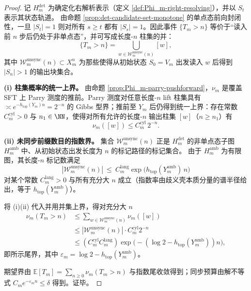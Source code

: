 \begin{proof}
记 \(H_m^{\mathrm{det}}\) 为确定化右解析表示（定义 \ref{def:Phi_m-right-resolving}），并以 \(S_t\) 表示其状态轨道。
由命题 \ref{prop:det-candidate-set-monotone} 的单点态前向封闭性，一旦 \(|S_t|=1\) 则对所有 \(s\ge t\) 都有 \(|S_s|=1\)。因此事件 \(\{T_m>n\}\) 等价于“读入前 \(n\) 步后仍处于非单点态”，并可写成长度-\(n\) 柱集的并：
\[
\{T_m>n\}=\bigcup_{w\in\mathcal{W}_{m}^{\mathrm{unsync}}(n)}[w],
\]
其中 \(\mathcal{W}_{m}^{\mathrm{unsync}}(n)\subset X_m^n\) 为那些使得从初始状态 \(S_0=V_m\) 出发读入 \(w\) 后得到 \(|S_n|>1\) 的输出块集合。
\par
\textbf{(i) 柱集概率的统一上界。}
由命题 \ref{prop:Phi_m-parry-pushforward}，\(\nu_m\) 是覆盖 SFT 上 Parry 测度的推前。Parry 测度对任意长度-\(n\) lift 柱集具有 \(\asymp e^{-h_{\mathrm{top}}(Y_m)n}=2^{-n}\) 的 Gibbs 型界；推前至 \(Y_m\) 后仍得到统一上界：存在常数 \(C_m^{\mathrm{cyl}}>0\) 与 \(n_1\in\NN\)，使得对所有允许的长度-\(n\) 输出柱集 \([w]\)（\(n\ge n_1\)）有
\[
\nu_m([w])\le C_m^{\mathrm{cyl}}\,2^{-n}.
\]
\par
\textbf{(ii) 未同步前缀数目的指数界。}
集合 \(\mathcal{W}_{m}^{\mathrm{unsync}}(n)\) 正是 $H_m^{\mathrm{det}}$ 的非单点态子图 $H_m^{\mathrm{amb}}$ 中、从初始状态出发长度为 \(n\) 的标记路径的标记集合。
由于 $H_m^{\mathrm{amb}}$ 为有限图，其长度-\(n\) 标记数满足
\[
|\mathcal{W}_{m}^{\mathrm{unsync}}(n)|
\ \le\
C_m^{\mathrm{lang}}\exp\!\bigl(h_{\mathrm{top}}(Y_m^{\mathrm{amb}})\,n\bigr)
\]
对某个常数 \(C_m^{\mathrm{lang}}>0\) 与所有充分大 \(n\) 成立（指数率由歧义壳本质分量的谱半径给出，等于 \(h_{\mathrm{top}}(Y_m^{\mathrm{amb}})\)）。
\par
将 (i)(ii) 代入并用并集上界，得对充分大 \(n\)
\[
\begin{aligned}
\nu_m(T_m>n)
&\le \sum_{w\in\mathcal{W}_{m}^{\mathrm{unsync}}(n)}\nu_m([w])\\
&\le |\mathcal{W}_{m}^{\mathrm{unsync}}(n)|\cdot C_m^{\mathrm{cyl}}2^{-n}\\
&\le (C_m^{\mathrm{cyl}}C_m^{\mathrm{lang}})\exp\!\bigl(-(\log 2-h_{\mathrm{top}}(Y_m^{\mathrm{amb}}))n\bigr),
\end{aligned}
\]
即所示尾界，其中 \(\varepsilon_m=\log 2-h_{\mathrm{top}}(Y_m^{\mathrm{amb}})\)。
\par
期望界由
\(
\mathbb{E}[T_m]=\sum_{n\ge 0}\nu_m(T_m>n)
\)
与指数尾收敛得到；同步预算由解不等式 \(C_m e^{-\varepsilon_m n}\le\delta\) 得到。证毕。
\end{proof}

